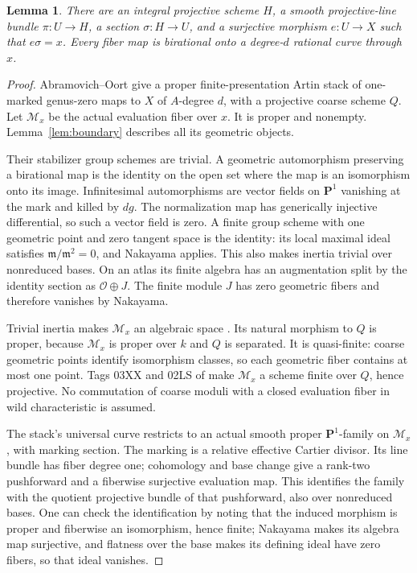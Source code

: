 \documentclass[11pt]{article}
\newtheorem{lemma}[theorem]{Lemma}
\newcommand{\PP}{\mathbf P}
\newcommand{\OO}{\mathcal O}
\begin{document}
\begin{lemma}\label{lem:family}
There are an integral projective scheme $H$, a smooth projective-line
bundle $\pi:U\to H$, a section $\sigma:H\to U$, and a surjective
morphism $e:U\to X$ such that $e\sigma=x$. Every fiber map is birational
onto a degree-$d$ rational curve through $x$.
\end{lemma}
\begin{proof}
Abramovich--Oort \cite[Theorem 2.8 and \S2.5]{AbramovichOort} give a proper
finite-presentation Artin stack of one-marked genus-zero maps to $X$ of
$A$-degree $d$, with a projective coarse scheme $Q$. Let $\mathcal M_x$
be the actual evaluation fiber over $x$. It is proper and nonempty.
Lemma~\ref{lem:boundary} describes all its geometric objects.

Their stabilizer group schemes are trivial. A geometric automorphism
preserving a birational map is the identity on the open set where the map
is an isomorphism onto its image. Infinitesimal automorphisms are vector
fields on $\PP^1$ vanishing at the mark and killed by $dg$. The
normalization map has generically injective differential, so such a
vector field is zero. A finite group scheme with one geometric point and
zero tangent space is the identity: its local maximal ideal satisfies
$\mathfrak m/\mathfrak m^2=0$, and Nakayama applies.
This also makes inertia trivial over nonreduced bases. On an atlas its
finite algebra has an augmentation split by the identity section as
$\OO\oplus J$. The finite module $J$ has zero geometric fibers and
therefore vanishes by Nakayama.

Trivial inertia makes $\mathcal M_x$ an algebraic space
\cite[Tag 04SZ]{Stacks}. Its natural morphism to $Q$ is proper, because
$\mathcal M_x$ is proper over $k$ and $Q$ is separated. It is quasi-finite:
coarse geometric points identify isomorphism classes, so each geometric
fiber contains at most one point. Tags 03XX and 02LS of \cite{Stacks}
make $\mathcal M_x$ a scheme finite over $Q$, hence projective.
No commutation of coarse moduli with a closed evaluation fiber in wild
characteristic is assumed.

The stack's universal curve restricts to an actual smooth proper
$\PP^1$-family on $\mathcal M_x$, with marking section. The marking is
a relative effective Cartier divisor. Its line bundle has fiber degree
one; cohomology and base change give a rank-two pushforward and a
fiberwise surjective evaluation map. This identifies the family with
the quotient projective bundle of that pushforward, also over nonreduced
bases. One can check the identification by noting that the induced
morphism is proper and fiberwise an isomorphism, hence finite; Nakayama
makes its algebra map surjective, and flatness over the base makes its
defining ideal have zero fibers, so that ideal vanishes.


\end{proof}
\end{document}
